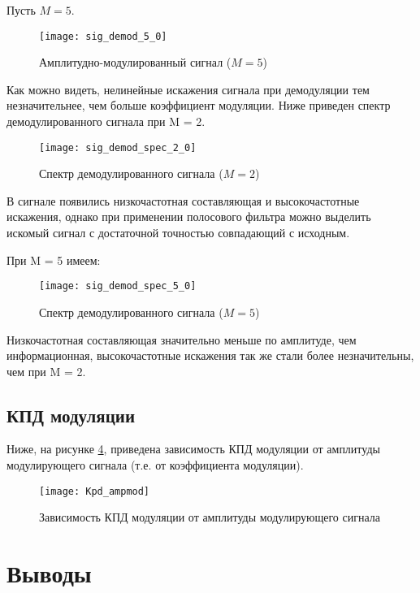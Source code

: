 Пусть $M = 5$.
\begin{figure}[H]
	\begin{center}
		\texttt{[image: sig\_demod\_5\_0]}
		\caption{Амплитудно-модулированный сигнал ($M = 5$)} 
		\label{pic:sig_demod_5_0} %
	\end{center}
\end{figure}
Как можно видеть, нелинейные искажения сигнала при демодуляции тем незначительнее, чем больше коэффициент модуляции.
Ниже приведен спектр демодулированного сигнала при M = 2.
\begin{figure}[H]
	\begin{center}
		\texttt{[image: sig\_demod\_spec\_2\_0]}
		\caption{Спектр демодулированного сигнала ($M = 2$)} 
		\label{pic:sig_demod_spec_2_0} %
	\end{center}
\end{figure}
В сигнале появились низкочастотная составляющая и высокочастотные искажения, однако при применении полосового фильтра можно выделить искомый сигнал с достаточной точностью совпадающий с исходным.

При M = 5 имеем:
\begin{figure}[H]
	\begin{center}
		\texttt{[image: sig\_demod\_spec\_5\_0]}
		\caption{Спектр демодулированного сигнала ($M = 5$)} 
		\label{pic:sig_demod_spec_5_0} %
	\end{center}
\end{figure} 
Низкочастотная составляющая значительно меньше по амплитуде, чем информационная, высокочастотные искажения так же стали более незначительны, чем при M = 2.

\subsection{КПД модуляции}
Ниже, на рисунке \ref{pic:Kpd_ampmod}, приведена зависимость КПД модуляции от амплитуды модулирующего сигнала (т.е. от коэффициента модуляции).
\begin{figure}[H]
	\begin{center}
		\texttt{[image: Kpd\_ampmod]}
		\caption{Зависимость КПД модуляции от амплитуды модулирующего сигнала} 
		\label{pic:Kpd_ampmod} %
	\end{center}
\end{figure}

\section{Выводы}

